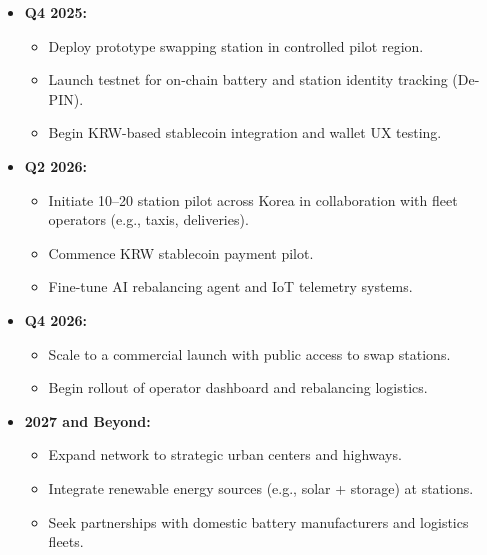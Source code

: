 \documentclass[12pt,a4paper]{article}
\begin{document}
\begin{itemize}[leftmargin=1.5em]
  \item \textbf{Q4 2025:}  
    \begin{itemize}[leftmargin=*, label=\(\bullet\)]
      \item Deploy prototype swapping station in controlled pilot region.  
      \item Launch testnet for on-chain battery and station identity tracking (De-PIN).
      \item Begin KRW-based stablecoin integration and wallet UX testing.
    \end{itemize}
  \item \textbf{Q2 2026:}  
    \begin{itemize}[leftmargin=*, label=\(\bullet\)]
      \item Initiate 10–20 station pilot across Korea in collaboration with fleet operators (e.g., taxis, deliveries).  
      \item Commence KRW stablecoin payment pilot.  
      \item Fine-tune AI rebalancing agent and IoT telemetry systems.
    \end{itemize}
  \item \textbf{Q4 2026:}  
    \begin{itemize}[leftmargin=*, label=\(\bullet\)]
      \item Scale to a commercial launch with public access to swap stations.  
      \item Begin rollout of operator dashboard and rebalancing logistics.
    \end{itemize}
  \item \textbf{2027 and Beyond:}  
    \begin{itemize}[leftmargin=*, label=\(\bullet\)]
      \item Expand network to strategic urban centers and highways.  
      \item Integrate renewable energy sources (e.g., solar + storage) at stations.  
      \item Seek partnerships with domestic battery manufacturers and logistics fleets.
    \end{itemize}
\end{itemize}


\end{document}
